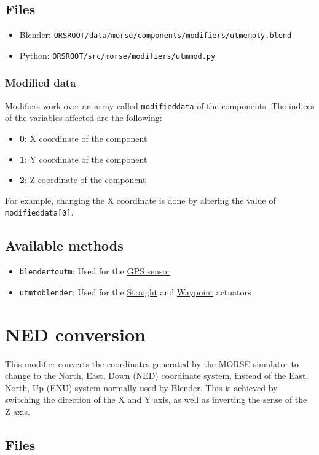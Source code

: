 \documentclass[twoside,a4paper,10pt]{report}
\newcommand{\dokutitlelevelone}[1]{\chapter{#1}}
\newcommand{\dokutitleleveltwo}[1]{\section{#1}}
\newcommand{\dokutitleleveltree}[1]{\subsection{#1}}
\newcommand{\dokubold}[1]{\textbf{#1}}
\newcommand{\dokumonospace}[1]{\texttt{#1}}
\newcommand{\dokuitem}{\item}
\begin{document}
\dokutitleleveltwo{Files}
\label{45b963397aa40d4a0063e0d85e4fe7a1}%

\begin{itemize}
\dokuitem  Blender: \dokumonospace{{\textdollar}ORS{\textunderscore}ROOT/data/morse/components/modifiers/utm{\textunderscore}empty.blend}
\dokuitem  Python: \dokumonospace{{\textdollar}ORS{\textunderscore}ROOT/src/morse/modifiers/utm{\textunderscore}mod.py}
\end{itemize}

\dokutitleleveltree{Modified data}
\label{c1a1a093b7ca2545d0d88cac0ff8ccf6}%
Modifiers work over an array called \dokumonospace{modified{\textunderscore}data} of the components.
The indices of the variables affected are the following:


\begin{itemize}
\dokuitem  \dokubold{0}: X coordinate of the component
\dokuitem  \dokubold{1}: Y coordinate of the component
\dokuitem  \dokubold{2}: Z coordinate of the component
\end{itemize}

For example, changing the X coordinate is done by altering the value of \dokumonospace{modified{\textunderscore}data[0]}.


\dokutitleleveltwo{Available methods}
\label{a2d06dcb42bbd0519b19166fd7f36cea}%

\begin{itemize}
\dokuitem  \dokumonospace{blender{\textunderscore}to{\textunderscore}utm}: Used for the \hyperref[11648e4e66e7ed6a86cb7f1d0cf604fe]{ GPS sensor}
\dokuitem  \dokumonospace{utm{\textunderscore}to{\textunderscore}blender}: Used for the \hyperref[6990a54322d9232390a784c5c9247dd6]{ Straight} and \hyperref[f75862c2bd0040eb683048c313dcaaa8]{ Waypoint} actuators
\end{itemize}

\dokutitlelevelone{NED conversion}
\label{95cc2c00e60ea8d7ee8c566b6598de36}%
\label{f68daad189b2fffd0b8cab5e36ec9d96}%
This modifier converts the coordinates generated by the MORSE simulator to change to the North, East, Down (NED) coordinate system, instead of the East, North, Up (ENU) system normally used by Blender.
This is achieved by switching the direction of the X and Y axis, as well as inverting the sense of the Z axis.


\dokutitleleveltwo{Files}
\label{45b963397aa40d4a0063e0d85e4fe7a1}%
\end{document}
